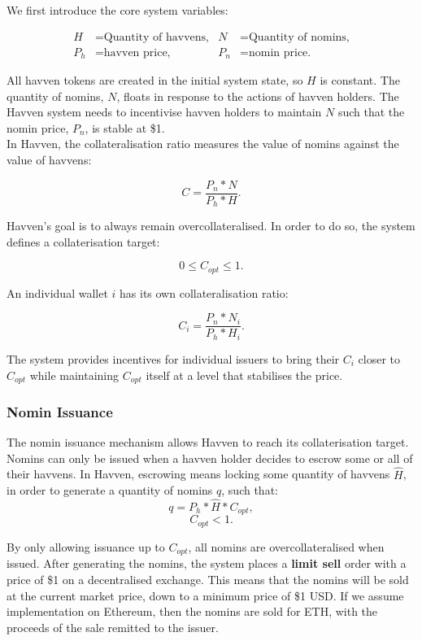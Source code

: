 \noindent We first introduce the core system variables:

\begin{align*}
H &= \text{Quantity of havvens,} & N &= \text{Quantity of nomins,} \\
P_h &= \text{havven price,}  & P_n &= \text{nomin price.}
\end{align*}

\noindent All havven tokens are created in the initial system state, so $H$ is constant. The quantity of nomins, $N$, floats in response to the actions of havven holders. The Havven system needs to incentivise havven holders to maintain $N$ such that the nomin price, $P_n$, is stable at \$1. \\

\noindent In Havven, the collateralisation ratio measures the value of nomins against the value of havvens:

$$ C = \frac{P_n * N}{P_h * H}. $$

\noindent Havven's goal is to always remain overcollateralised. In order to do so, the system defines a collaterisation target:

$$ 0 \leq C_{opt} \leq 1. $$

\noindent An individual wallet $i$ has its own collateralisation ratio:

$$ C_i = \frac{P_n * N_i}{P_h * H_i}. $$

\noindent The system provides incentives for individual issuers to bring their $C_i$ closer to $C_{opt}$ while maintaining $C_{opt}$ itself at a level that stabilises the price.

\subsubsection{Nomin Issuance}

\noindent The nomin issuance mechanism allows Havven to reach its collaterisation target. Nomins can only be issued when a havven holder decides to escrow some or all of their havvens. In Havven, escrowing means locking some quantity of havvens $\hat{H}$, in order to generate a quantity of nomins $q$, such that:
$$ q = P_h * \hat{H} * C_{opt}, $$
$$ C_{opt} < 1. $$

\noindent By only allowing issuance up to $C_{opt}$, all nomins are overcollateralised when issued. After generating the nomins, the system places a \textbf{limit sell} order with a price of \$1 on a decentralised exchange. This means that the nomins will be sold at the current market price, down to a minimum price of \$1 USD. If we assume implementation on Ethereum, then the nomins are sold for ETH, with the proceeds of the sale remitted to the issuer. \\


